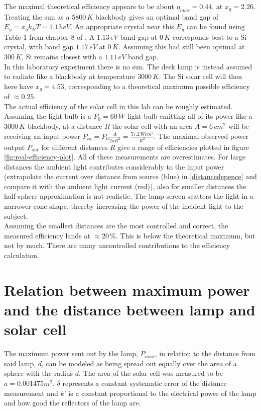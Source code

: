 \documentclass[a4paper,twoside=false,abstract=false,numbers=noenddot,
titlepage=false,headings=small,parskip=half,version=last]{scrartcl}
\begin{document}
The maximal theoretical efficiency appears to be about $\eta_{max}=0.44$, at $x_g=2.26$.
Treating the sun as a $5800\,K$ blackbody gives an optimal band gap of $E_g =
x_g k_B T = 1.13\,eV$.
An appropriate crystal near this $E_g$ can be found using Table 1 from chapter 8 of \cite{Kittel}.
A $1.13\,eV$ band gap at $0\,K$ corresponds best to a Si crystal, with band gap
$1.17\,eV$ at $0\,K$.
Assuming this had still been optimal at $300\,K$, Si remains closest with a
$1.11\,eV$ band gap.\\
In this laboratory experiment there is no sun. The desk lamp is instead assumed to radiate like a blackbody at temperature $3000\,K$. The Si solar cell will then here have $x_g = 4.53$, corresponding to a theoretical maximum possible efficiency of $\approx 0.25$.\\
The actual efficiency of the solar cell in this lab can be roughly estimated.
Assuming the light bulb is a $P_0=60\,W$ light bulb emitting all of its power
like a $3000\,K$ blackbody, at a distance $R$ the solar cell with an area
$A=6\,cm^2$ will be receiving an input power $P_{in} = P_0 \frac{A}{2\pi R^2}
= \frac{57.2\,Wcm^2}{R^2}$.
The maximal observed power output $P_{out}$ for different distances $R$ give a range of efficiencies plotted in figure \ref{fig:real-efficiency-plot}.
All of these measurements are overestimates.
For large distances the ambient light contributes considerably to the input
power (extrapolate the current over distance from source (blue) in
\ref{distancedepence} and compare it with the ambient light current (red)),
also for smaller distances the half-sphere approximation is not realistic.
The lamp screen scatters the light in a narrower cone shape, thereby increasing
the power of the incident light to the subject.\\
Assuming the smallest distances are the most controlled and correct, the measured efficiency lands at $\approx 20\,\%$.
This is below the theoretical maximum, but not by much. There are many uncontrolled contributions to the efficiency calculation.

\section{Relation between maximum power and the distance between lamp and solar cell}
The maximum power sent out by the lamp, $P_{max}$, in relation to the distance from said lamp, $d$, can be modeled as being spread out equally over the area of a sphere with the radius $d$. The area of the solar cell was measured to be $a=0.001475 m^{2}$. $\delta$ represents a constant systematic error of the distance measurement and $k’$ is a constant proportional to the electrical power of the lamp and how good the reflectors of the lamp are.
\end{document}
